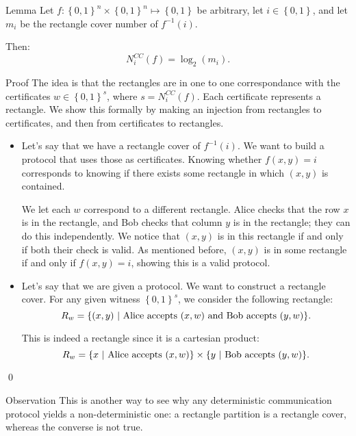 \documentclass[a4paper]{article}
\begin{document}
\begin{parag}{Lemma}
    Let $f: \left\{0, 1\right\}^n \times \left\{0, 1\right\}^n \mapsto \left\{0, 1\right\}$ be arbitrary, let $i \in \left\{0, 1\right\}$, and let $m_i$ be the rectangle cover number of $f^{-1}\left(i\right)$.

    Then: 
    \[N_i^{CC}\left(f\right) = \log_2\left(m_i\right).\]

    \begin{subparag}{Proof}
        The idea is that the rectangles are in one to one correspondance with the certificates $w \in \left\{0, 1\right\}^s$, where $s = N_i^{CC}\left(f\right)$. Each certificate represents a rectangle. We show this formally by making an injection from rectangles to certificates, and then from certificates to rectangles.

        \begin{itemize}[left=0pt]
            \item Let's say that we have a rectangle cover of $f^{-1}\left(i\right)$. We want to build a protocol that uses those as certificates. Knowing whether $f\left(x, y\right) = i$ corresponds to knowing if there exists some rectangle in which $\left(x, y\right)$ is contained.
                
                We let each $w$ correspond to a different rectangle. Alice checks that the row $x$ is in the rectangle, and Bob checks that column $y$ is in the rectangle; they can do this independently. We notice that $\left(x, y\right)$ is in this rectangle if and only if both their check is valid. As mentioned before, $\left(x, y\right)$ is in some rectangle if and only if $f\left(x, y\right) = i$, showing this is a valid protocol.
            \item Let's say that we are given a protocol. We want to construct a rectangle cover. For any given witness $\left\{0, 1\right\}^s$, we consider the following rectangle: 
        \[R_w = \left\{\left(x, y\right) \suchthat \text{Alice accepts $\left(x, w\right)$ and Bob accepts $\left(y, w\right)$}\right\}.\]

        This is indeed a rectangle since it is a cartesian product: 
        \[R_w = \left\{x \suchthat \text{Alice accepts $\left(x, w\right)$}\right\} \times \left\{y \suchthat \text{Bob accepts $\left(y, w\right)$}\right\}.\]
        \end{itemize}

        \qed
    \end{subparag}

    \begin{subparag}{Observation}
        This is another way to see why any deterministic communication protocol yields a non-deterministic one: a rectangle partition is a rectangle cover, whereas the converse is not true.
    \end{subparag}
\end{parag}
\end{document}
